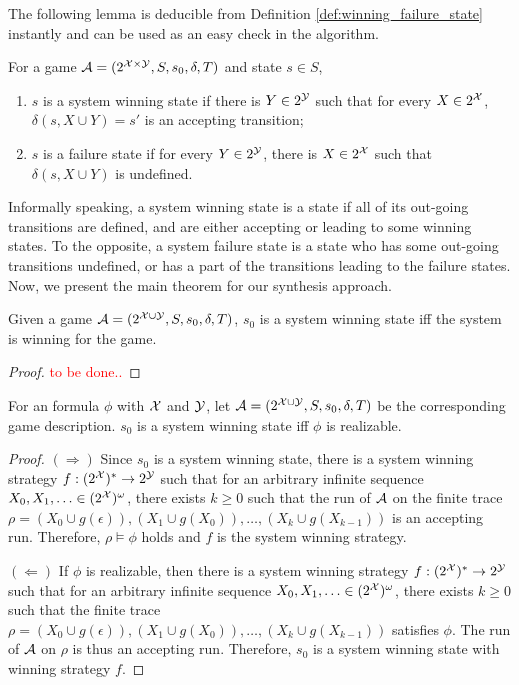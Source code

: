 The following lemma is deducible from Definition \ref{def:winning_failure_state} instantly and can be used as an easy check in the algorithm. 

\begin{lemma}
For a \tdfa game $\mathcal{A} =(2^{\mathcal{X}\times \mathcal{Y}},S,s_0,\delta,T)$ and state $s\in S$, 
\begin{enumerate}
	\item $s$ is a system winning state if there is $Y \in 2^{\mathcal{Y}}$ such that for every $X \in 2^{\mathcal{X}}$, $\delta(s,X\cup Y)=s'$ is an accepting transition;
	\item $s$ is a failure state if for every $Y \in 2^{\mathcal{Y}}$, there is $X \in 2^{\mathcal{X}}$ such that $\delta(s,X \cup Y)$ is undefined.
\end{enumerate} 
\end{lemma}

Informally speaking, a system winning state is a state if all of its out-going transitions are defined, and are either accepting or leading to some winning states. To the opposite, a system failure state is a state who has some out-going transitions undefined, or has a part of the transitions leading to the failure states. 
Now, we present the main theorem for our synthesis approach. 

\begin{theorem}\label{thm:winning-and-failure}
Given a \tdfa game $\mathcal{A} =(2^{\mathcal{X} \cup \mathcal{Y}},S,s_0,\delta,T)$, $s_0$ is a system winning state iff the system is winning for the game.
\end{theorem}
\begin{proof}
\textcolor{red}{to be done..}
\end{proof}

\begin{theorem}\label{thm:system-and-game}
For an \ltlf formula $\phi$ with $\mathcal{X}$ and $\mathcal{Y}$, let $\mathcal{A} =(2^{\mathcal{X} \cup \mathcal{Y}},S,s_0,\delta,T)$ be the corresponding \tdfa game description. $s_0$ is a system winning state iff $\phi$ is realizable.
\end{theorem}
\begin{proof}
$(\Rightarrow)$ Since $s_0$ is a system winning state, there is a system winning strategy $f: (2^{\mathcal{X}})^* \rightarrow 2^{\mathcal{Y}}$ such that for an arbitrary infinite sequence $X_0,X_1,\ldots\in (2^{\mathcal{X}})^{\omega}$, there exists $k \geq 0$ such that the run of $\mathcal{A}$ on the finite trace $\rho=(X_0\cup g(\epsilon)),(X_1\cup g(X_0)), \ldots, (X_k\cup g(X_{k-1}))$  is an accepting run. Therefore, $\rho \models \phi$ holds and $f$ is the system winning strategy.

$(\Leftarrow)$ If $\phi$ is realizable, then there is a system winning strategy $f: (2^{\mathcal{X}})^* \rightarrow 2^{\mathcal{Y}}$ such that for an arbitrary infinite sequence $X_0,X_1,\ldots\in (2^{\mathcal{X}})^{\omega}$, there exists $k \geq 0$ such that the finite trace $\rho=(X_0\cup g(\epsilon)),(X_1\cup g(X_0)), \ldots, (X_k\cup g(X_{k-1}))$ satisfies $\phi$. The run of $\mathcal{A}$ on $\rho$ is thus an accepting run. Therefore, $s_0$ is a system winning state with winning strategy $f$.
\end{proof}

